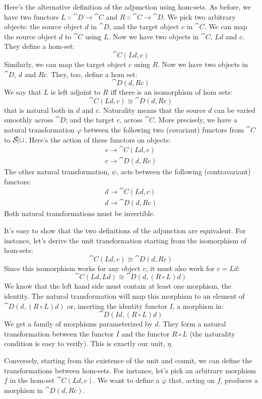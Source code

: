 \noindent
Here's the alternative definition of the adjunction using hom-sets. As
before, we have two functors $L \Colon \cat{D} \to \cat{C}$ and
$R \Colon \cat{C} \to \cat{D}$. We pick two arbitrary objects: the
source object $d$ in $\cat{D}$, and the target object $c$
in $\cat{C}$. We can map the source object $d$ to $\cat{C}$ using
$L$. Now we have two objects in $\cat{C}$, $L d$ and
$c$. They define a hom-set:
\[\cat{C}(L d, c)\]
Similarly, we can map the target object $c$ using $R$. Now
we have two objects in $\cat{D}$, $d$ and $R c$. They,
too, define a hom set:
\[\cat{D}(d, R c)\]
We say that $L$ is left adjoint to $R$ iff there is an
isomorphism of hom sets:
\[\cat{C}(L d, c) \cong \cat{D}(d, R c)\]
that is natural both in $d$ and $c$.
Naturality means that the source $d$ can be varied smoothly
across $\cat{D}$; and the target $c$, across $\cat{C}$. More
precisely, we have a natural transformation $\varphi$ between the
following two (covariant) functors from $\cat{C}$ to $\mathcal{S\mkern-3mu et}$. Here's
the action of these functors on objects:
\begin{gather*}
c \to \cat{C}(L d, c) \\
c \to \cat{D}(d, R c)
\end{gather*}
The other natural transformation, $\psi$, acts between the following
(contravariant) functors:
\begin{gather*}
d \to \cat{C}(L d, c) \\
d \to \cat{D}(d, R c)
\end{gather*}
Both natural transformations must be invertible.

It's easy to show that the two definitions of the adjunction are
equivalent. For instance, let's derive the unit transformation starting
from the isomorphism of hom-sets:
\[\cat{C}(L d, c) \cong \cat{D}(d, R c)\]
Since this isomorphism works for any object $c$, it must also
work for $c = L d$:
\[\cat{C}(L d, L d) \cong \cat{D}(d, (R \circ L) d)\]
We know that the left hand side must contain at least one morphism, the
identity. The natural transformation will map this morphism to an
element of $\cat{D}(d, (R \circ L) d)$ or, inserting the identity
functor $I$, a morphism in:
\[\cat{D}(I d, (R \circ L) d)\]
We get a family of morphisms parameterized by $d$. They form a
natural transformation between the functor $I$ and the functor
$R \circ L$ (the naturality condition is easy to verify). This is
exactly our unit, $\eta$.

Conversely, starting from the existence of the unit and counit, we can
define the transformations between hom-sets. For instance, let's pick an
arbitrary morphism $f$ in the hom-set $\cat{C}(L d, c)$. We
want to define a $\varphi$ that, acting on $f$, produces a
morphism in $\cat{D}(d, R c)$.

